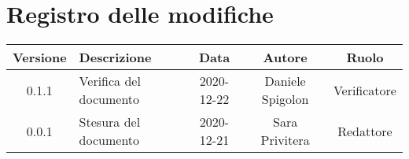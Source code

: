 \section*{Registro delle modifiche}

\begin{center}
	\begin{longtable}{|c|p{5cm}|c|c|c|}
	\hline
	\rowcolor{lighter-grayer}
	\textbf{Versione} & \textbf{Descrizione} & \textbf{Data} & \textbf{Autore} & \textbf{Ruolo} \\
	\hline
	\endfirsthead


		\hline
	0.1.1 & Verifica del documento & 2020-12-22 & Daniele Spigolon & Verificatore \\
	\hline
	0.0.1 & Stesura del documento & 2020-12-21 & Sara Privitera & Redattore \\
	\hline
	
    
	\end{longtable}
\end{center}
